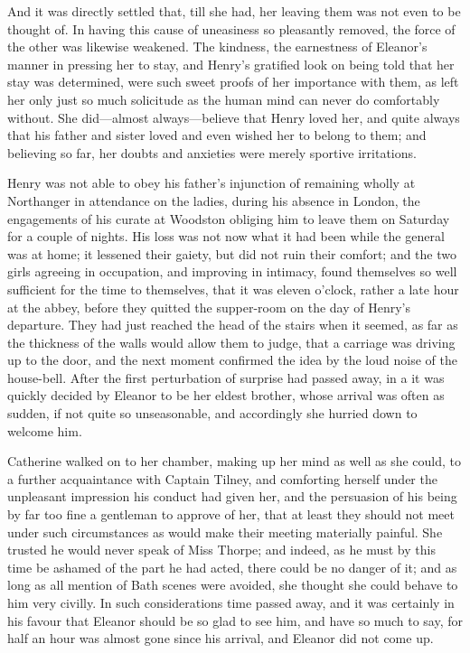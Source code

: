 

 And it was directly settled that, till she had, her leaving them was not even to be thought of. In having this cause of uneasiness so pleasantly removed, the force of the other was likewise weakened. The kindness, the earnestness of Eleanor's manner in pressing her to stay, and Henry's gratified look on being told that her stay was determined, were such sweet proofs of her importance with them, as left her only just so much solicitude as the human mind can never do comfortably without. She did---almost always---believe that Henry loved her, and quite always that his father and sister loved and even wished her to belong to them; and believing so far, her doubts and anxieties were merely sportive irritations.

Henry was not able to obey his father's injunction of remaining wholly at Northanger in attendance on the ladies, during his absence in London, the engagements of his curate at Woodston obliging him to leave them on Saturday for a couple of nights. His loss was not now what it had been while the general was at home; it lessened their gaiety, but did not ruin their comfort; and the two girls agreeing in occupation, and improving in intimacy, found themselves so well sufficient for the time to themselves, that it was eleven o'clock, rather a late hour at the abbey, before they quitted the supper-room on the day of Henry's departure. They had just reached the head of the stairs when it seemed, as far as the thickness of the walls would allow them to judge, that a carriage was driving up to the door, and the next moment confirmed the idea by the loud noise of the house-bell. After the first perturbation of surprise had passed away, in a  it was quickly decided by Eleanor to be her eldest brother, whose arrival was often as sudden, if not quite so unseasonable, and accordingly she hurried down to welcome him.

Catherine walked on to her chamber, making up her mind as well as she could, to a further acquaintance with Captain Tilney, and comforting herself under the unpleasant impression his conduct had given her, and the persuasion of his being by far too fine a gentleman to approve of her, that at least they should not meet under such circumstances as would make their meeting materially painful. She trusted he would never speak of Miss Thorpe; and indeed, as he must by this time be ashamed of the part he had acted, there could be no danger of it; and as long as all mention of Bath scenes were avoided, she thought she could behave to him very civilly. In such considerations time passed away, and it was certainly in his favour that Eleanor should be so glad to see him, and have so much to say, for half an hour was almost gone since his arrival, and Eleanor did not come up.

